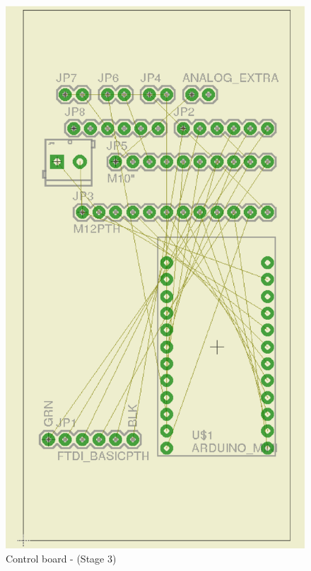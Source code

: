 \documentclass[12pt,a4paper]{report}
\begin{document}
\begin{figure}[H]
\centering
\includegraphics*[scale=0.25]{control_brd_s3}
\caption{Control board -  (Stage 3)}
\label{Control-brd-s3}
\end{figure}
\ \\
\end{document}
